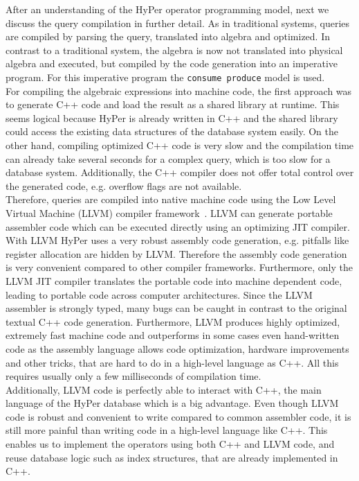 After an understanding of the HyPer operator programming model, next we discuss the query compilation in further detail. As in traditional systems, queries are compiled by parsing the query, translated into algebra and optimized. In contrast to a traditional system, the algebra is now not translated into physical algebra and executed, but compiled by the code generation into an imperative program. For this imperative program the \texttt{consume produce} model is used.
\\
For compiling the algebraic expressions into machine code, the first approach was to generate C++ code and load the result as a shared library at runtime. This seems logical because HyPer is already written in C++ and the shared library could access the existing data structures of the database system easily. On the other hand, compiling optimized C++ code is very slow and the compilation time can already take several seconds for a complex query, which is too slow for a database system. Additionally, the C++ compiler does not offer total control over the generated code, e.g. overflow flags are not available. 
\\
Therefore, queries are compiled into native machine code using the Low Level Virtual Machine (LLVM) compiler framework~\parencite{LLVM}. LLVM can generate portable assembler code which can be executed directly using an optimizing JIT compiler. With LLVM HyPer uses a very robust assembly code generation, e.g. pitfalls like register allocation are hidden by LLVM. Therefore the assembly code generation is very convenient compared to other compiler frameworks. Furthermore, only the LLVM JIT compiler translates the portable code into machine dependent code, leading to portable code across computer architectures. Since the LLVM assembler is strongly typed, many bugs can be caught in contrast to the original textual C++ code generation. Furthermore, LLVM produces highly optimized, extremely fast machine code and outperforms in some cases even hand-written code as the assembly language allows code optimization, hardware improvements and other tricks, that are hard to do in a high-level language as C++. All this requires usually only a few milliseconds of compilation time.
\\
Additionally, LLVM code is perfectly able to interact with C++, the main language of the HyPer database which is a big advantage. Even though LLVM code is robust and convenient to write compared to common assembler code, it is still more painful than writing code in a high-level language like C++. This enables us to implement the operators using both C++ and LLVM code, and reuse database logic such as index structures, that are already implemented in C++. 
